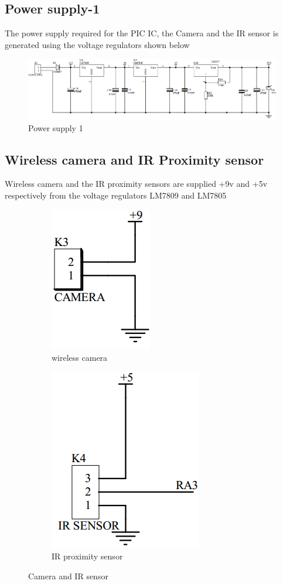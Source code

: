 \documentclass{report}
\begin{document}
\subsection{Power supply-1}
The power supply required for the PIC IC, the Camera and the IR sensor is generated using the voltage regulators shown below
\begin{figure}[h!]
\centering
\includegraphics[scale=0.65,angle=90]{circpwrsupply1}
\caption{Power supply 1}
\label{fig211}
\end{figure}
\FloatBarrier
\subsection{Wireless camera and IR Proximity sensor}
Wireless camera and the IR proximity sensors are supplied +9v and +5v respectively from the voltage regulators LM7809 and LM7805\\
\begin{figure}[h!]
\begin{subfigure}{0.5\textwidth}
	\centering
	\includegraphics[scale=1]{circcamera}
	\caption{wireless camera}
\end{subfigure}

\begin{subfigure}{0.5\textwidth}
	\centering
	\includegraphics[scale=0.8]{circir}
	\caption{IR proximity sensor}
\end{subfigure}%
\caption{Camera and IR sensor}
\label{fig212}
\end{figure}
\end{document}
